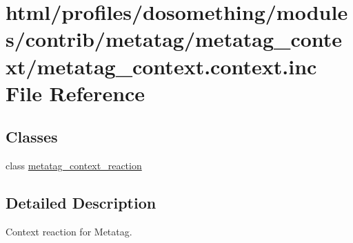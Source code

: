 \hypertarget{metatag__context_8context_8inc}{
\section{html/profiles/dosomething/modules/contrib/metatag/metatag\_\-context/metatag\_\-context.context.inc File Reference}
\label{metatag__context_8context_8inc}
}
\subsection*{Classes}
\begin{DoxyCompactItemize}
\item 
class \hyperlink{classmetatag__context__reaction}{metatag\_\-context\_\-reaction}
\end{DoxyCompactItemize}


\subsection{Detailed Description}
Context reaction for Metatag. 